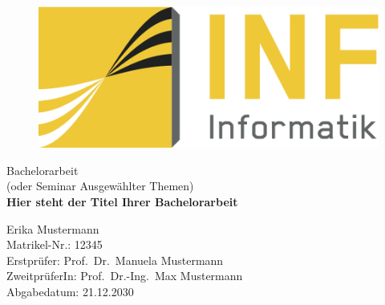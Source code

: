 \begin{titlepage}
    \begin{figure}
        \begin{flushright}
            \includegraphics[scale=0.75]{images/INFLogo.png}
        \end{flushright}
    \end{figure}

    {\centering

    \vspace{4.5cm}
    {\Large Bachelorarbeit}\\
    (oder Seminar Ausgewählter Themen)\\
    \vspace{1.5cm}
    {\LARGE{\textbf{Hier steht der Titel Ihrer Bachelorarbeit}}}\\
    \vspace{2cm}

    \vspace{1.0cm}
    Erika Mustermann\\
    Matrikel-Nr.: 12345\\
    \vspace{2.0cm}
    Erstprüfer: Prof.\ Dr.\ Manuela Mustermann\\
    \vspace{0.5cm}
    ZweitprüferIn: Prof.\ Dr.-Ing.\ Max Mustermann\\
    \vspace{1.5cm}
    {\small Abgabedatum: 21.12.2030}\\
    \vspace{1.5cm}
}

\end{titlepage}
